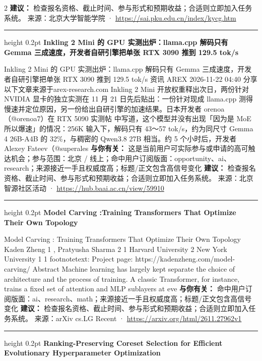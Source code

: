 \documentclass[10.5pt]{ctexart}
\begin{document}
\begin{multicols}{2}
\textbf{建议：} 检查报名资格、截止时间、参与形式和预期收益；合适则立即加入任务系统。
{\footnotesize\color{ormuted} 来源：北京大学智能学院 · \url{https://sai.pku.edu.cn/index/kycg.htm}}
\vspace{2mm}
\hrule height 0.2pt
\vspace{2mm}
{\large\bfseries Inkling 2 Mini 的 GPU 实测出炉：llama.cpp 解码只有 Gemma 三成速度，开发者自研引擎把单张 RTX 3090 推到 129.5 tok/s}\par
Inkling 2 Mini 的 GPU 实测出炉：llama.cpp 解码只有 Gemma 三成速度，开发者自研引擎把单张 RTX 3090 推到 129.5 tok/s 资讯 AREX 2026-11-22 04:40 分享 以下文章来源于arex-research.com Inkling 2 Mini 开放权重释出次日，两份针对 NVIDIA 显卡的独立实测在 11 月 21 日先后贴出：一份针对现成 llama.cpp 测得慢速并定位原因，另一份给出自研引擎的加速结果。日本开发者 orenoa（@orenoa7）在 RTX 5090 实测帖 中写道，这个模型并没有出现「因为是 MoE 所以爆速」的情况：256K 输入下，解码只有 43～57 tok/s，约为同尺寸 Gemma 4 26B-A4B 的 32\%，与稠密的 Qwen3.8 27B 相当。约 5 个小时后，开发者 Alexey Fateev（@superales
\textbf{与你有关：} 这是当前用户可实际参与或申请的高可触达机会；参与范围：北京 / 线上；命中用户订阅版面：opportunity、ai、research；来源接近一手且权威度高；标题/正文包含高信号变化
\textbf{建议：} 检查报名资格、截止时间、参与形式和预期收益；合适则立即加入任务系统。
{\footnotesize\color{ormuted} 来源：北京智源社区活动 · \url{https://hub.baai.ac.cn/view/59910}}
\vspace{2mm}
\hrule height 0.2pt
\vspace{2mm}
{\large\bfseries Model Carving :Training Transformers That Optimize Their Own Topology}\par
Model Carving : Training Transformers That Optimize Their Own Topology Kaden Zheng 1 , Pratyusha Sharma 2 1 Harvard University 2 New York University 1 1 footnotetext: Project page: https://kadenzheng.com/model-carving/ Abstract Machine learning has largely kept separate the choice of architecture and the process of training. A classic Transformer, for instance, trains a fixed set of attention and MLP sublayers at eve
\textbf{与你有关：} 命中用户订阅版面：ai、research、math；来源接近一手且权威度高；标题/正文包含高信号变化
\textbf{建议：} 检查报名资格、截止时间、参与形式和预期收益；合适则立即加入任务系统。
{\footnotesize\color{ormuted} 来源：arXiv cs.LG Recent · \url{https://arxiv.org/html/2611.27962v1}}
\vspace{2mm}
\hrule height 0.2pt
\vspace{2mm}
{\large\bfseries Ranking-Preserving Coreset Selection for Efficient Evolutionary Hyperparameter Optimization}\par

\end{multicols}
\end{document}
